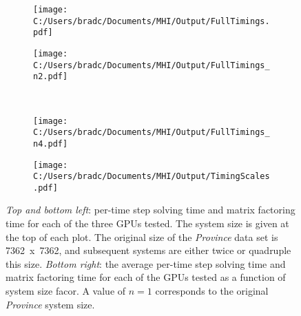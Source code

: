 \documentclass[11pt,letterpaper]{article}
\begin{document}
\begin{figure}[!ht]
    \centering
    \begin{subfigure}{0.48\textwidth}
        \texttt{[image: C:/Users/bradc/Documents/MHI/Output/FullTimings.pdf]}
    \end{subfigure}
    \;
    \begin{subfigure}{0.48\textwidth}
        \texttt{[image: C:/Users/bradc/Documents/MHI/Output/FullTimings\_n2.pdf]}
    \end{subfigure}
    \\
    \begin{subfigure}{0.48\textwidth}
        \texttt{[image: C:/Users/bradc/Documents/MHI/Output/FullTimings\_n4.pdf]}
    \end{subfigure}
    \;
    \begin{subfigure}{0.49\textwidth}
        \texttt{[image: C:/Users/bradc/Documents/MHI/Output/TimingScales.pdf]}
    \end{subfigure}
    \caption{{\it Top and bottom left}: per-time step solving time and matrix factoring time for each of the 
    three GPUs tested. The system size is given at the top of each plot. The original size of the 
    \emph{Province} data set is 7362~x~7362, and subsequent systems are either twice or quadruple 
    this size. {\it Bottom right}: the average per-time step solving time and matrix factoring time for
    each of the GPUs tested as a function of system size facor. A value of $n=1$ corresponds to the 
    original \emph{Province} system size.}
    \label{f:all_timings}
\end{figure}
        
\end{document}
